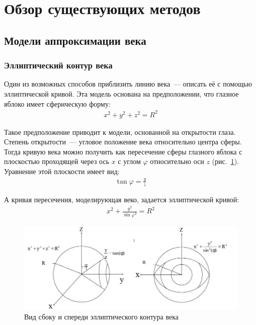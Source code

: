 \documentclass[12pt,a4paper]{article} %
\begin{document}
\newpage
\section{Обзор существующих методов}
\subsection{Модели аппроксимации века}

\subsubsection{Эллиптический контур века}

Один из возможных способов приблизить линию века~--- описать её с помощью эллиптической кривой. Эта модель основана на предположении, что глазное яблоко имеет сферическую форму:
\begin{gather}\label{sphear}
	x^2+y^2+z^2= R^2
\end{gather}

Такое предположение приводит к модели, основанной на открытости глаза. Степень открытости~--- угловое положение века относительно центра сферы. Тогда кривую века можно получить как пересечение сферы глазного яблока с плоскостью проходящей через ось $x$ с углом $\varphi$ относительно оси $z$ (рис.~\ref{fig:glaz4}). Уравнение этой плоскости имеет вид:
\begin{gather}\label{el1}
	\tan{\varphi}= \frac{y}{z}
\end{gather}

А кривая пересечения, моделирующая веко, задается эллиптической кривой:
\begin{gather}\label{el2}
	x^2+\frac{y^2}{\sin{\varphi}^2}=R^2
\end{gather}

\begin{figure}[h]
	
	\centering
	
	\includegraphics[width=0.8\linewidth]{glaz4.jpg}
	
	\caption{Вид сбоку и спереди эллиптического контура века}
	
	\label{fig:glaz4}
	
\end{figure}
\end{document}
